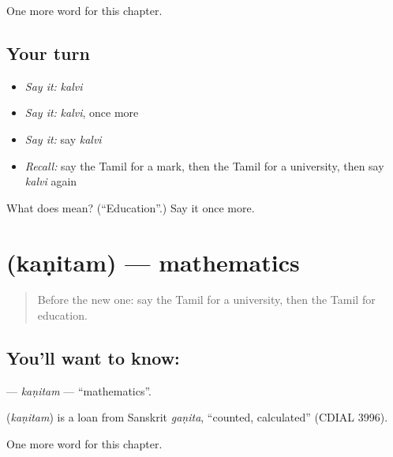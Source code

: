 \begin{grammarlens}[title={What you've built}]
One more word for this chapter.
\end{grammarlens}

\subsection*{Your turn}
\begin{itemize}
\raggedright
  \item \emph{Say it:} \emph{kalvi}
  \item \emph{Say it:} \emph{kalvi}, once more
  \item \emph{Say it:} say \emph{kalvi}
  \item \emph{Recall:} say the Tamil for a mark, then the Tamil for a university, then say \emph{kalvi} again
\end{itemize}

\begin{tcolorbox}[breakable,colback=teal!4,colframe=teal!35!black,title={Before you move on}]
What does  mean? (\textquotedblleft{}Education\textquotedblright{}.) Say it once more.
\end{tcolorbox}
\section[\texorpdfstring{\ta{கணிதம்} (kaṇitam)}{கணிதம் (kaṇitam)}]{ (kaṇitam) — mathematics}

\label{lesson:TA-C252-kanitam}



\begin{quote}
Before the new one: say the Tamil for a university, then the Tamil for education.
\end{quote}

\subsection*{You'll want to know: }
\textbf{} — \emph{kaṇitam} — \textquotedblleft{}mathematics\textquotedblright{}.

\begin{cousinweb}
\textbf{} (\emph{kaṇitam}) is a loan from Sanskrit \emph{gaṇita}, \textquotedblleft{}counted, calculated\textquotedblright{} (CDIAL 3996).
\end{cousinweb}

\begin{grammarlens}[title={What you've built}]
One more word for this chapter.
\end{grammarlens}

